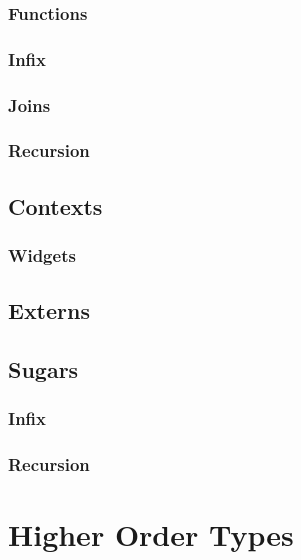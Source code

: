 \documentclass[twocolumn]{article}
\begin{document}
\subsubsection*{Functions}


\subsubsection*{Infix}
\subsubsection*{Joins}
\subsubsection*{Recursion}

\subsection{Contexts}
\subsubsection*{Widgets}
\subsection{Externs}
\subsection{Sugars}
\subsubsection*{}
\subsubsection*{Infix}
\subsubsection*{Recursion}

\section{Higher Order Types}
\end{document}
